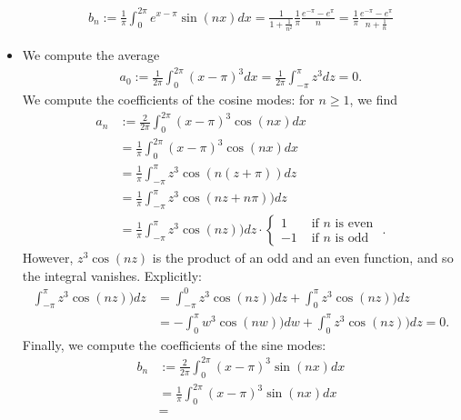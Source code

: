 \documentclass[11pt]{article}
\begin{document}
\begin{solution}
\begin{itemize}
\begin{align*}
            b_n:= \frac{1}{\pi}
                    \int_{0}^{2\pi} e^{x - \pi} \sin(n x) dx = \frac{1}{1 + \frac{1}{n^2}} \frac{1}{\pi}\frac{e^{-\pi} - e^{\pi}}{n} = \frac{1}{\pi}  \frac{e^{-\pi} - e^{\pi}}{n + \frac{1}{n}}
        \end{align*}
    \item
    We compute the average 
    \begin{align*}
        a_0
        :=
        \frac{1}{2\pi} \int_{0}^{2\pi} (x-\pi)^{3} dx
        =
        \frac{1}{2\pi} \int_{-\pi}^{\pi} z^{3} dz
        =
        0
        .
    \end{align*}
    We compute the coefficients of the cosine modes: for $n \geq 1$, we find 
    \begin{align*}
        a_n
        &:=
        \frac{2}{2\pi} \int_{0}^{2\pi} (x-\pi)^{3} \cos(nx) dx
        \\&=
        \frac{1}{\pi} \int_{0}^{2\pi} (x-\pi)^{3} \cos(nx) dx
        \\&=
        \frac{1}{\pi} \int_{-\pi}^{\pi} z^{3} \cos(n(z+\pi)) dz
        \\&=
        \frac{1}{\pi} \int_{-\pi}^{\pi} z^{3} \cos(nz+n\pi)) dz
        \\&=
        \frac{1}{\pi} \int_{-\pi}^{\pi} z^{3} \cos(nz)) dz
        \cdot \left\{\begin{array}{ll} 1 & \text{ if $n$ is even } \\ -1 & \text{ if $n$ is odd } \end{array}\right.
        .
    \end{align*}
    However, $z^3 \cos(nz)$ is the product of an odd and an even function, and so the integral vanishes. 
    Explicitly:
    \begin{align*}
        \int_{-\pi}^{\pi} z^{3} \cos(nz)) dz
        &=
        \int_{-\pi}^{0} z^{3} \cos(nz)) dz
        + 
        \int_{0}^{\pi} z^{3} \cos(nz)) dz
        \\&=
        - 
        \int_{0}^{\pi} w^{3} \cos(nw)) dw
        + 
        \int_{0}^{\pi} z^{3} \cos(nz)) dz
        = 
        0.
    \end{align*}
    Finally, we compute the coefficients of the sine modes:
    \begin{align*}
        b_n
        &:=
        \frac{2}{2\pi} \int_{0}^{2\pi} (x-\pi)^{3} \sin(nx) dx
        \\&=
        \frac{1}{\pi} \int_{0}^{2\pi} (x-\pi)^{3} \sin(nx) dx
        \\&=

\end{align*}
\end{itemize}
\end{solution}
\end{document}
